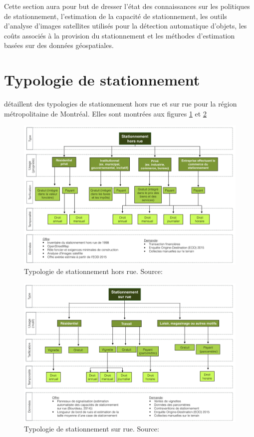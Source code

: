 \label{sec:RevLitt}
Cette section aura pour but de dresser l'état des connaissances sur les politiques de stationnement, l'estimation de la capacité de stationnement, les outils d'analyse d'images satellites utilisés pour la détection automatique d'objets, les coûts associés à la provision du stationnement et les méthodes d'estimation basées sur des données géospatiales.

\section{Typologie de stationnement}\label{sec:typologie_stationnement}
  \textcite{morency_stationnement_2017} détaillent des typologies de stationnement hors rue et sur rue pour la région métropolitaine de Montréal. Elles sont montrées aux figures \ref{fig:Typo_Stat_hors_rue} et \ref{fig:Typo_Stat_sur_rue}
  \begin{figure}[ht]
      \centering
      \includegraphics[width=1.0\textwidth]{images/Typologie_Stationnement_hors_rue.png}
      \caption{Typologie de stationnement hors rue. Source: \cite{morency_stationnement_2017}}
      \label{fig:Typo_Stat_hors_rue}
  \end{figure}
  \begin{figure}[ht]
      \centering
      \includegraphics[width=1.0\textwidth]{images/Typologie_Stationnement_sur_rue.png}
      \caption{Typologie de stationnement sur rue. Source: \cite{morency_stationnement_2017}}
      \label{fig:Typo_Stat_sur_rue}
  \end{figure}
